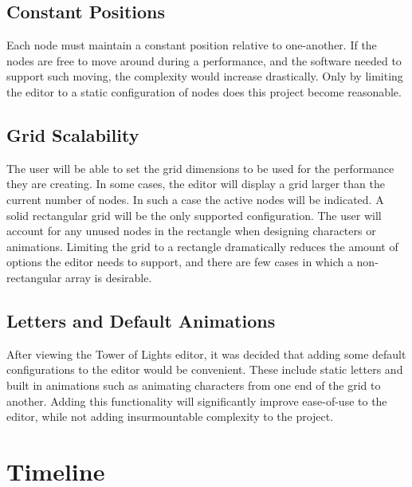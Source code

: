 \documentclass[12pt]{article}
\begin{document}
  	\subsection{Constant Positions}
    	Each node must maintain a constant position relative to one-another. If the nodes are free to move around during a performance, and the software needed to support such moving, the complexity would increase drastically. Only by limiting the editor to a static configuration of nodes does this project become reasonable. 
      
  	\subsection{Grid Scalability}
    	The user will be able to set the grid dimensions to be used for the performance they are creating. In some cases, the editor will display a grid larger than the current number of nodes. In such a case the active nodes will be indicated. A solid rectangular grid will be the only supported configuration. The user will account for any unused nodes in the rectangle when designing characters or animations. Limiting the grid to a rectangle dramatically reduces the amount of options the editor needs to support, and there are few cases in which a non-rectangular array is desirable.
      
  	\subsection{Letters and Default Animations}
    	After viewing the Tower of Lights editor, it was decided that adding some default configurations to the editor would be convenient. These include static letters and built in animations such as animating characters from one end of the grid to another. Adding this functionality will significantly improve ease-of-use to the editor, while not adding insurmountable complexity to the project. 
      
\newpage
	\section{Timeline}
\end{document}
